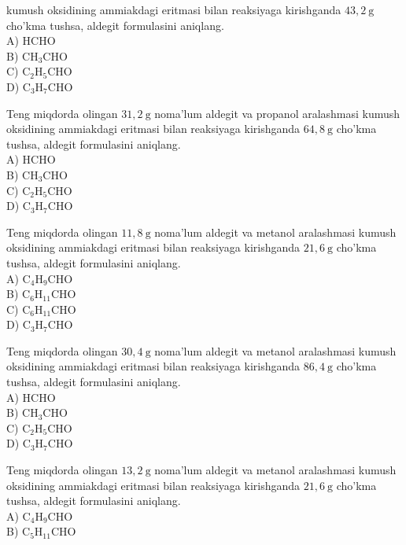 kumush oksidining ammiakdagi eritmasi bilan reaksiyaga kirishganda $43,2 \mathrm{~g}$ cho'kma tushsa, aldegit formulasini aniqlang.\\
A) HCHO\\
B) $\mathrm{CH}_{3} \mathrm{CHO}$\\
C) $\mathrm{C}_{2} \mathrm{H}_{5} \mathrm{CHO}$\\
D) $\mathrm{C}_{3} \mathrm{H}_{7} \mathrm{CHO}$
  \item Teng miqdorda olingan $31,2 \mathrm{~g}$ noma'lum aldegit va propanol aralashmasi kumush oksidining ammiakdagi eritmasi bilan reaksiyaga kirishganda $64,8 \mathrm{~g}$ cho'kma tushsa, aldegit formulasini aniqlang.\\
A) HCHO\\
B) $\mathrm{CH}_{3} \mathrm{CHO}$\\
C) $\mathrm{C}_{2} \mathrm{H}_{5} \mathrm{CHO}$\\
D) $\mathrm{C}_{3} \mathrm{H}_{7} \mathrm{CHO}$
  \item Teng miqdorda olingan $11,8 \mathrm{~g}$ noma'lum aldegit va metanol aralashmasi kumush oksidining ammiakdagi eritmasi bilan reaksiyaga kirishganda $21,6 \mathrm{~g}$ cho'kma tushsa, aldegit formulasini aniqlang.\\
A) $\mathrm{C}_{4} \mathrm{H}_{9} \mathrm{CHO}$\\
B) $\mathrm{C}_{6} \mathrm{H}_{11} \mathrm{CHO}$\\
C) $\mathrm{C}_{6} \mathrm{H}_{11} \mathrm{CHO}$\\
D) $\mathrm{C}_{3} \mathrm{H}_{7} \mathrm{CHO}$
  \item Teng miqdorda olingan $30,4 \mathrm{~g}$ noma'lum aldegit va metanol aralashmasi kumush oksidining ammiakdagi eritmasi bilan reaksiyaga kirishganda $86,4 \mathrm{~g}$ cho'kma tushsa, aldegit formulasini aniqlang.\\
A) HCHO\\
B) $\mathrm{CH}_{3} \mathrm{CHO}$\\
C) $\mathrm{C}_{2} \mathrm{H}_{5} \mathrm{CHO}$\\
D) $\mathrm{C}_{3} \mathrm{H}_{7} \mathrm{CHO}$
  \item Teng miqdorda olingan $13,2 \mathrm{~g}$ noma'lum aldegit va metanol aralashmasi kumush oksidining ammiakdagi eritmasi bilan reaksiyaga kirishganda $21,6 \mathrm{~g}$ cho'kma tushsa, aldegit formulasini aniqlang.\\
A) $\mathrm{C}_{4} \mathrm{H}_{9} \mathrm{CHO}$\\
B) $\mathrm{C}_{5} \mathrm{H}_{11} \mathrm{CHO}$\\
